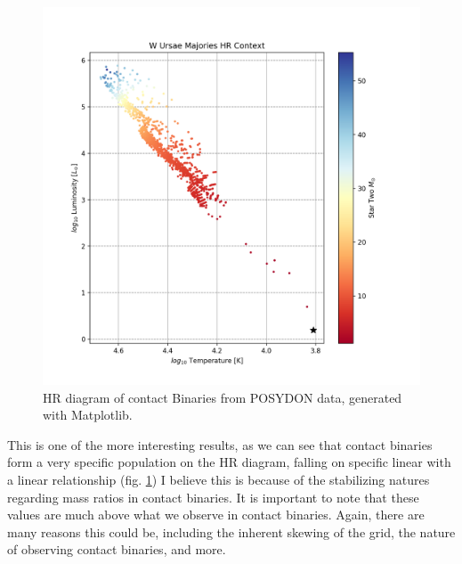\documentclass[12pt, a4paper]{article}
\begin{document}
        \begin{figure}[H]
            \centering
            \includegraphics[scale = .6]{figs/GeneratedFigs/W_UMa/WUMaHRDiagram.png}
            \caption{HR diagram of contact Binaries from POSYDON data, generated with Matplotlib.}
            \label{contactBinaryHRDiagram}
        \end{figure}


        This is one of the more interesting results, as we can see that contact binaries form a very specific population on the HR diagram, falling on specific linear with a linear relationship (fig. \ref{contactBinaryHRDiagram}) I believe this is because of the stabilizing natures regarding mass ratios in contact binaries. It is important to note that these values are much above what we observe in contact binaries. Again, there are many reasons this could be, including the inherent skewing of the grid, the nature of observing contact binaries, and more. 
        
\end{document}
